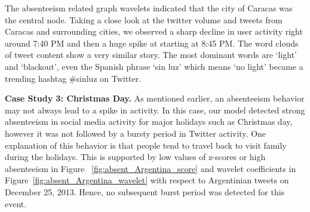 The absenteeism related graph wavelets indicated that the city of Caracas
was the central node. Taking a close look at the twitter volume and tweets from Caracas and surrounding cities, we observed a sharp decline in user activity right around 7:40 PM and then a huge spike at starting at 8:45 PM.
The word clouds of tweet content show a very similar story.
The most dominant words are `light' and `blackout', even the Spanish phrase `sin luz' which means `no light' became a trending hashtag \#sinluz on Twitter.


\textbf{Case Study 3: Christmas Day.}
As mentioned earlier, an absenteeism behavior may not always lead to a spike in activity. In this case, our model detected strong absenteeism in social media activity for major holidays such as Christmas day, however it was not followed by a bursty period in Twitter activity. One explanation of this behavior is that people tend to travel back to visit family during the holidays. This is supported by low values of z-scores or high absenteeism in Figure~ \ref{fig:absent_Argentina_score} and wavelet coefficients in Figure~\ref{fig:absent_Argentina_wavelet} with respect to Argentinian tweets on December 25, 2013. Hence, no subsequent burst period was detected for this event.

